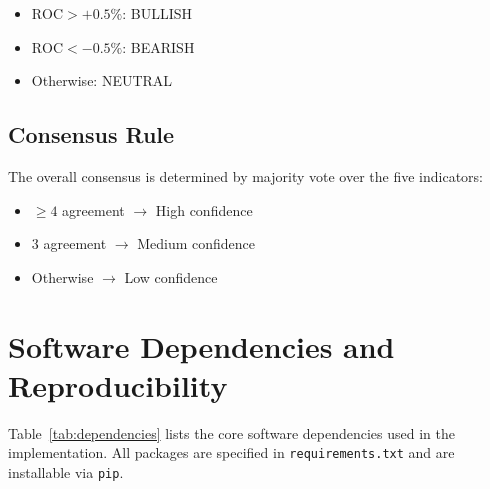 \begin{itemize}
\item $\mathrm{ROC} > +0.5\%$: BULLISH
\item $\mathrm{ROC} < -0.5\%$: BEARISH
\item Otherwise: NEUTRAL
\end{itemize}


\subsection{Consensus Rule}

The overall consensus is determined by majority vote over the five indicators:
\begin{itemize}
\item $\geq 4$ agreement $\rightarrow$ High confidence
\item $3$ agreement $\rightarrow$ Medium confidence
\item Otherwise $\rightarrow$ Low confidence
\end{itemize}

\section{Software Dependencies and Reproducibility}
\label{app:dependencies}

Table~\ref{tab:dependencies} lists the core software dependencies used in the implementation. All packages are specified in \texttt{requirements.txt} and are installable via \texttt{pip}.

